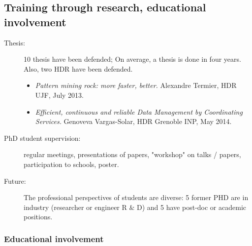 \subsection{Training through research, educational involvement} %
\label{sub:hadas_training_through_research_educational_involvment}


\begin{description}

\item[Thesis:]  10 thesis have been defended;  On average, a thesis is done in four years. 
Also, two HDR have been defended. 
\begin{itemize}
\item \emph{Pattern mining rock: more faster, better.} Alexandre Termier, HDR UJF, July 2013. 

\item \emph{Efficient, continuous and reliable Data Management by Coordinating Services.} Genoveva Vargas-Solar, HDR Grenoble INP, May 2014. 
\end{itemize}

\item[PhD student supervision:] regular meetings, presentations of papers, "workshop" on talks / papers, participation to schools, poster.

\item[Future:]  
The professional perspectives of students are diverse: 5 former PHD are in industry (researcher or engineer R  $\&$ D) and 5 have post-doc or academic positions. 

\end{description}

\subsubsection*{Educational involvement} %

